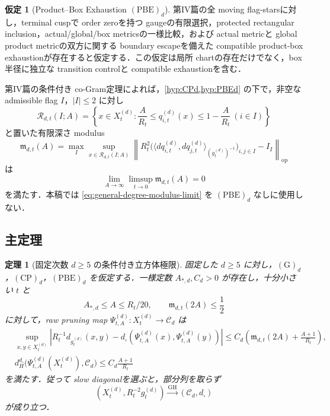 \documentclass[a4paper,11pt]{ltjsarticle}
\numberwithin{equation}{section}
\theoremstyle{plain}
\newtheorem{theorem}{定理}[section]
\theoremstyle{definition}
\newtheorem{hypothesis}[hypothesis]{仮定}
\theoremstyle{remark}
\newcommand{\GH}{\mathrm{GH}}
\newcommand{\Cd}{\mathcal C_d}
\begin{document}
\begin{hypothesis}[Product--Box Exhaustion $\mathrm{(PBE)}_d$]\label{hyp:PBEd}
第IV篇の全 moving flag-starsに対し，terminal cuspで order zeroを持つ gaugeの有限選択，protected rectangular inclusion，actual/global/box metricsの一様比較，および actual metricと global product metricの双方に関する boundary escapeを備えた compatible product-box exhaustionが存在すると仮定する．この仮定は局所 chartの存在だけでなく，box半径に独立な transition controlと compatible exhaustionを含む．
\end{hypothesis}

第IV篇の条件付き co-Gram定理によれば，\cref{hyp:CPd,hyp:PBEd} の下で，非空な admissible flag $I$，$|I|\le2$ に対し
\[
 \mathcal R_{d,t}(I;A)=
 \left\{x\in X_t^{(d)}:\frac A{R_t}\le q_{i,t}^{(d)}(x)\le1-\frac A{R_t}\ (i\in I)\right\}
\]
と置いた有限深さ modulus
\begin{equation}\label{eq:general-degree-modulus}
 \mathfrak m_{d,t}(A)=
 \max_I\sup_{x\in\mathcal R_{d,t}(I;A)}
 \left\|R_t^2\bigl(\langle dq_{i,t}^{(d)},dq_{j,t}^{(d)}\rangle_{(g_t^{(d)})^{-1}}\bigr)_{i,j\in I}-I_I\right\|_{\mathrm{op}}
\end{equation}
は
\begin{equation}\label{eq:general-degree-modulus-limit}
 \lim_{A\to\infty}\limsup_{t\to0}\mathfrak m_{d,t}(A)=0
\end{equation}
を満たす．本稿では \eqref{eq:general-degree-modulus-limit} を $\mathrm{(PBE)}_d$ なしに使用しない．

\subsection{主定理}

\begin{theorem}[固定次数 $d\ge5$ の条件付き立方体極限]\label{thm:degree-d-limit}
固定した $d\ge5$ に対し，$\mathrm{(G)}_d$，$\mathrm{(CP)}_d$，$\mathrm{(PBE)}_d$ を仮定する．一様定数 $A_{*,d},C_d>0$ が存在し，十分小さい $t$ と
\[
 A_{*,d}\le A\le R_t/20,
 \qquad \mathfrak m_{d,t}(2A)\le\frac12
\]
に対して，raw pruning map $\Psi_{t,A}^{(d)}:X_t^{(d)}\to\Cd$ は
\begin{align}
 &\sup_{x,y\in X_t^{(d)}}
 \left|R_t^{-1}d_{g_t^{(d)}}(x,y)
 -d_\square(\Psi_{t,A}^{(d)}(x),\Psi_{t,A}^{(d)}(y))\right|
 \le C_d\left(\mathfrak m_{d,t}(2A)+\frac{A+1}{R_t}\right),\label{eq:degree-d-distortion}\\
 &d_H^{d_\square}\bigl(\Psi_{t,A}^{(d)}(X_t^{(d)}),\Cd\bigr)
 \le C_d\frac{A+1}{R_t}\label{eq:degree-d-density}
\end{align}
を満たす．従って slow diagonalを選ぶと，部分列を取らず
\begin{equation}\label{eq:degree-d-GH}
 (X_t^{(d)},R_t^{-2}g_t^{(d)})\xrightarrow{\GH}(\Cd,d_\square)
\end{equation}
が成り立つ．
\end{theorem}
\end{document}
